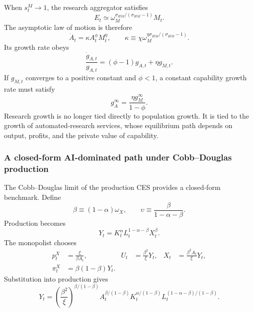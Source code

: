 When $s^M_t\to1$, the research aggregator satisfies
\begin{equation}
    E_t
    \simeq
    \omega_M^{\sigma_{HM}/(\sigma_{HM}-1)}M_t.
    \label{eq:ai-dominated-research}
\end{equation}
The asymptotic law of motion is therefore
\begin{equation}
    \dot A_t
    =
    \kappa A_t^\phi M_t^\eta,
    \qquad
    \kappa\equiv
    \chi\omega_M^{\eta\sigma_{HM}/(\sigma_{HM}-1)}.
    \label{eq:ai-dominated-ideas}
\end{equation}
Its growth rate obeys
\begin{equation}
    \frac{\dot g_{A,t}}{g_{A,t}}
    =
    (\phi-1)g_{A,t}+\eta g_{M,t}.
    \label{eq:ai-growth-rate-dynamics}
\end{equation}
If $g_{M,t}$ converges to a positive constant and $\phi<1$, a constant capability
growth rate must satisfy
\begin{equation}
    g_A^\infty
    =
    \frac{\eta g_M^\infty}{1-\phi}.
    \label{eq:ai-dominated-ga}
\end{equation}
Research growth is no longer tied directly to population growth. It is tied to the
growth of automated-research services, whose equilibrium path depends on output,
profits, and the private value of capability.

\subsubsection{A closed-form AI-dominated path under Cobb--Douglas production}

The Cobb--Douglas limit of the production CES provides a closed-form benchmark.
Define
\begin{equation}
    \beta\equiv(1-\alpha)\omega_X,
    \qquad
    \upsilon\equiv\frac{\beta}{1-\alpha-\beta}.
    \label{eq:beta-definition}
\end{equation}
Production becomes
\begin{equation}
    Y_t=K_t^\alpha L_t^{1-\alpha-\beta}X_t^\beta.
    \label{eq:cd-production}
\end{equation}
The monopolist chooses
\begin{align}
    p^X_t&=\frac{\xi}{\beta A_t},
    &
    U_t&=\frac{\beta^2}{\xi}Y_t,
    &
    X_t&=\frac{\beta^2A_t}{\xi}Y_t,
    \label{eq:cd-monopoly}\\
    \pi^X_t&=\beta(1-\beta)Y_t.
    \label{eq:cd-monopoly-rents}
\end{align}
Substitution into production gives
\begin{equation}
    Y_t
    =
    \left(\frac{\beta^2}{\xi}\right)^{\beta/(1-\beta)}
    A_t^{\beta/(1-\beta)}
    K_t^{\alpha/(1-\beta)}
    L_t^{(1-\alpha-\beta)/(1-\beta)}.
    \label{eq:reduced-production}
\end{equation}

